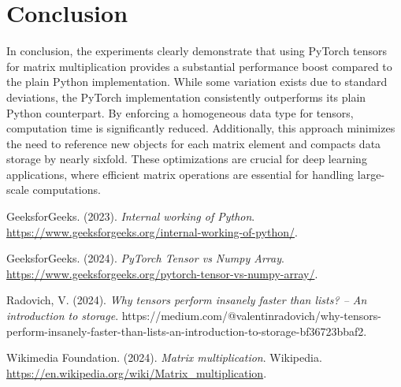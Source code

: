 \documentclass[12pt]{article}
\begin{document}
\section{Conclusion}
In conclusion, the experiments clearly demonstrate that using PyTorch tensors for matrix multiplication provides a substantial performance boost compared to the plain Python implementation.
While some variation exists due to standard deviations, the PyTorch implementation consistently outperforms its plain Python counterpart.
By enforcing a homogeneous data type for tensors, computation time is significantly reduced.
Additionally, this approach minimizes the need to reference new objects for each matrix element and compacts data storage by nearly sixfold.
These optimizations are crucial for deep learning applications, where efficient matrix operations are essential for handling large-scale computations.

\newpage

\begin{thebibliography}{4}
    GeeksforGeeks. (2023). \textit{Internal working of Python}. \url{https://www.geeksforgeeks.org/internal-working-of-python/}.
    
    GeeksforGeeks. (2024). \textit{PyTorch Tensor vs Numpy Array}. \url{https://www.geeksforgeeks.org/pytorch-tensor-vs-numpy-array/}.

    Radovich, V. (2024). \textit{Why tensors perform insanely faster than lists? -- An introduction to storage}. https://medium.com/@valentinradovich/why-tensors-perform-insanely-faster-than-lists-an-introduction-to-storage-bf36723bbaf2.


    Wikimedia Foundation. (2024). \textit{Matrix multiplication}. Wikipedia. \url{https://en.wikipedia.org/wiki/Matrix_multiplication}.
\end{thebibliography}
\end{document}
